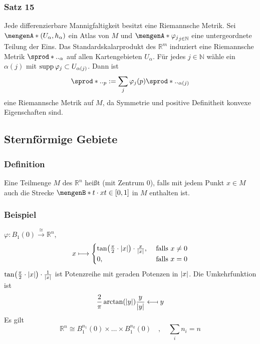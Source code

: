 \subsubsection{Satz 15} %
\label{ssub:322}
Jede differenzierbare Mannigfaltigkeit besitzt eine Riemannsche Metrik.
Sei $\set{(U_\alpha, h_\alpha)}$ ein Atlas von $M$ und $\set{\varphi_j}_{j \in \mathds{N}}$ eine untergeordnete Teilung der Eins. Das Standardskalarprodukt des 
$\mathds{R}^m$ induziert eine Riemannsche Metrik $\sprod*{.}{.}_\alpha$ auf allen Kartengebieten $U_\alpha$. Für jedes $j \in \mathds{N}$ wähle ein $\alpha(j)$ mit 
$\supp \varphi_j \subset U_{\alpha(j)}$. Dann ist 
\[
	\sprod*{.}{.}_p := \sum_{j} \varphi_j(p) \sprod*{.}{.}_{\alpha(j)} 
\]
eine Riemannsche Metrik auf $M$, da Symmetrie und positive Definitheit konvexe Eigenschaften sind. \bewende

\subsection{Sternförmige Gebiete} %
\label{sub:33}
\subsubsection{Definition} %
\label{ssub:331}
Eine Teilmenge $M$ des $\mathds{R}^n$ heißt  (mit Zentrum $0$), falls mit jedem Punkt $x \in M$ auch die Strecke $\set[t \cdot x]{t \in [0,1]}$ in $M$
enthalten ist.  

\subsubsection{Beispiel} %
\label{ssub:332}
$\varphi : B_1(0) \xrightarrow{\cong} \mathds{R}^n $, 
\[
	x \longmapsto   \begin{cases}
		\tan \enbrace*{\frac{\pi }{2} \cdot \abs*{x}} \cdot \frac{x}{\abs*{x}}, &\text{ falls }x \not=0\\
		0 , &\text{ falls } x=0
	\end{cases}
\]
$\tan \enbrace*{\frac{\pi }{2} \cdot \abs*{x}} \cdot \frac{1}{\abs*{x}}$ ist Potenzreihe mit geraden Potenzen in $\abs*{x}$. Die Umkehrfunktion ist
\[
	\frac{2}{\pi } \arctan (\abs*{y}) \frac{y}{\abs*{y} } \longmapsfrom y  
\]
Es gilt
\[
	\mathds{R}^n \cong B_1^{n_1}(0) \times \ldots \times B_1^{n_k}(0)\quad , \quad \sum_{i} n_i = n
\]

